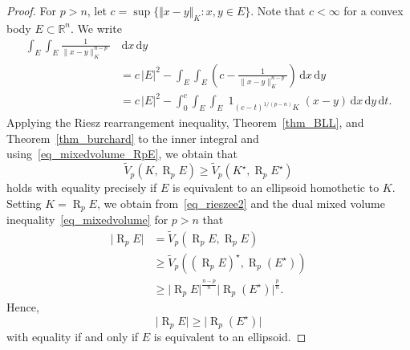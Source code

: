 \documentclass{amsart}
\newcommand{\omr}[1]{\operatorname{R}_{#1}}
\newcommand{\dvtex}{\,\mathrm{d}}
\newcommand{\vol}[1]{ \vert #1\vert}
\renewcommand{\chi}{\operatorname{1}}
\begin{document}
\begin{proof}

For $p>n$, let $c=\sup \{\Vert x-y\Vert _{K}: x,y\in E\}$. Note that
$c<\infty $ for a convex body $E\subset \mathbb R^{n}$. We write
%
\begin{align}
\int _{E}\int _{E} \frac{1}{\|x-y\|^{n-p}_{K}} &\dvtex x \dvtex y
\nonumber \\
&= c\, \vol{E}^{2} - \int _{E}\int _{E} (c-
\frac{1}{\|x-y\|^{n-p}_{K}}) \dvtex x \dvtex y
\nonumber \\
&= c\, \vol{E}^{2} - \int _{0}^{c} \int _{E}\int _{E} \chi _{(c-t)^{1/({p-n})}K}(x-y)
\dvtex x \dvtex y\dvtex t.
\nonumber \end{align}
%
Applying the Riesz rearrangement inequality, Theorem~\ref{thm_BLL}, and
Theorem~\ref{thm_burchard} to the inner integral and using~\eqref{eq_mixedvolume_RpE}, we obtain that
%
\begin{equation}
\label{eq_rieszee2}
\tilde V_{p}(K, \omr p E)
\ge \tilde V_{p}(K^{\star}, \omr p E^{\star})
\end{equation}
%
holds with equality precisely if $E$ is equivalent to an ellipsoid homothetic
to $K$. Setting $K=\omr p E$, we obtain from~\eqref{eq_rieszee2} and the
dual mixed volume inequality~\eqref{eq_mixedvolume} for $p>n$ that
%
\begin{align}
\vol{\omr {p} E} &=\tilde V_{p}(\omr p E, \omr p E)
\nonumber \\
&\ge \tilde V_{p}((\omr p E)^{\star}, \omr p (E^{\star}))
\nonumber \\
&\ge \vol{\omr p E}^{\frac{n-p}{n}} \vol{\omr p (E^{\star})}^{
\frac {p}{n}}.
\nonumber \end{align}
%
Hence,
%
\begin{equation}
\label{eq_dmv2}
\vol{\omr {p} E}\ge \vol{\omr {p} (E^{\star})}
\end{equation}
%
with equality if and only if $E$ is equivalent to an ellipsoid.


\end{proof}
\end{document}
